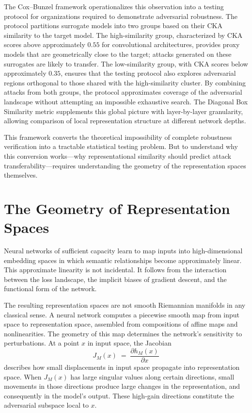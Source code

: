 \documentclass[12pt,a4paper]{article}
\theoremstyle{plain}
\theoremstyle{definition}
\begin{document}
The Cox--Bunzel framework operationalizes this observation into a testing
protocol for organizations required to demonstrate adversarial robustness.
The protocol partitions surrogate models into two groups based on their CKA
similarity to the target model. The high-similarity group, characterized by
CKA scores above approximately $0.55$ for convolutional architectures, provides
proxy models that are geometrically close to the target; attacks generated on
these surrogates are likely to transfer. The low-similarity group, with CKA
scores below approximately $0.35$, ensures that the testing protocol also
explores adversarial regions orthogonal to those shared with the
high-similarity cluster. By combining attacks from both groups, the protocol
approximates coverage of the adversarial landscape without attempting an
impossible exhaustive search. The Diagonal Box Similarity metric supplements
this global picture with layer-by-layer granularity, allowing comparison of
local representation structure at different network depths.

This framework converts the theoretical impossibility of complete robustness
verification into a tractable statistical testing problem. But to understand
why this conversion works---why representational similarity should predict
attack transferability---requires understanding the geometry of the
representation spaces themselves.

\section{The Geometry of Representation Spaces}

Neural networks of sufficient capacity learn to map inputs into
high-dimensional embedding spaces in which semantic relationships become
approximately linear. This approximate linearity is not incidental. It follows
from the interaction between the loss landscape, the implicit biases of gradient
descent, and the functional form of the network.

The resulting representation spaces are not smooth Riemannian manifolds in any
classical sense. A neural network computes a piecewise smooth map from input
space to representation space, assembled from compositions of affine maps and
nonlinearities. The geometry of this map determines the network's sensitivity
to perturbations. At a point $x$ in input space, the Jacobian
\[
J_M(x) \;=\; \frac{\partial h_M(x)}{\partial x}
\]
describes how small displacements in input space propagate into representation
space. When $J_M(x)$ has large singular values along certain directions, small
movements in those directions produce large changes in the representation, and
consequently in the model's output. These high-gain directions constitute the
adversarial subspace local to $x$.
\end{document}
